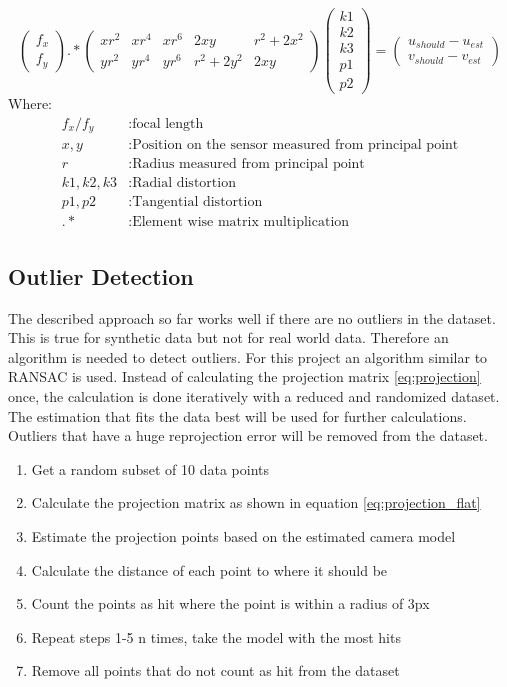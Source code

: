 \documentclass[11pt,a4paper,titlepage,oneside]{report}
\begin{document}
\begin{equation}\label{eq:distortion_lin}
	\begin{pmatrix}
		f_x\\
		f_y
	\end{pmatrix}.*
	\begin{pmatrix}
		xr^2 & xr^4 & xr^6 & 2xy & r^2+2x^2 \\
		yr^2 & yr^4 & yr^6 & r^2+2y^2 & 2xy
	\end{pmatrix}
	\begin{pmatrix}
		k1\\k2\\k3\\p1\\p2
	\end{pmatrix}=
	\begin{pmatrix}
		u_{should}-u_{est}\\
		v_{should}-v_{est}
	\end{pmatrix}
\end{equation}
Where:
\begin{align*}
  f_x/f_y		&: \text{focal length}\\
	x,y				&: \text{Position on the sensor measured from principal point}\\
	r					&: \text{Radius measured from principal point}\\
	k1,k2,k3	&: \text{Radial distortion}\\
	p1,p2			&: \text{Tangential distortion}\\
	.*				&: \text{Element wise matrix multiplication}
\end{align*}

\subsection{Outlier Detection}\label{sec:outliers}
The described approach so far works well if there are no outliers in the dataset. This is true for synthetic data but not for real world data. Therefore an algorithm is needed to detect outliers. For this project an algorithm similar to RANSAC \cite{ransac} is used. Instead of calculating the projection matrix \ref{eq:projection} once, the calculation is done iteratively with a reduced and randomized dataset. The estimation that fits the data best will be used for further calculations. Outliers that have a huge reprojection error will be removed from the dataset.
\begin{enumerate}
	\item Get a random subset of 10 data points
	\item Calculate the projection matrix as shown in equation \ref{eq:projection_flat}
	\item Estimate the projection points based on the estimated camera model
	\item Calculate the distance of each point to where it should be
	\item Count the points as hit where the point is within a radius of 3px
	\item Repeat steps 1-5 n times, take the model with the most hits
	\item Remove all points that do not count as hit from the dataset
\end{enumerate}
\end{document}
